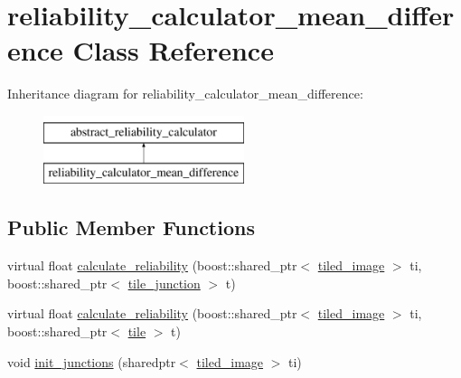 \hypertarget{classreliability__calculator__mean__difference}{\section{reliability\-\_\-calculator\-\_\-mean\-\_\-difference Class Reference}
\label{classreliability__calculator__mean__difference}
}
Inheritance diagram for reliability\-\_\-calculator\-\_\-mean\-\_\-difference\-:\begin{figure}[H]
\begin{center}
\leavevmode
\includegraphics[height=2.000000cm]{classreliability__calculator__mean__difference}
\end{center}
\end{figure}
\subsection*{Public Member Functions}
\begin{DoxyCompactItemize}
\item 
virtual float \hyperlink{classreliability__calculator__mean__difference_a2d64711ed370d44aae8c276e1507ee4a}{calculate\-\_\-reliability} (boost\-::shared\-\_\-ptr$<$ \hyperlink{classtiled__image}{tiled\-\_\-image} $>$ ti, boost\-::shared\-\_\-ptr$<$ \hyperlink{classtile__junction}{tile\-\_\-junction} $>$ t)
\item 
virtual float \hyperlink{classreliability__calculator__mean__difference_a9e03f2bdf2a04d9a414530598db0cbf4}{calculate\-\_\-reliability} (boost\-::shared\-\_\-ptr$<$ \hyperlink{classtiled__image}{tiled\-\_\-image} $>$ ti, boost\-::shared\-\_\-ptr$<$ \hyperlink{classtile}{tile} $>$ t)
\item 
void \hyperlink{classreliability__calculator__mean__difference_a6a49bd9cf9996cdee5919f2307ca473a}{init\-\_\-junctions} (sharedptr$<$ \hyperlink{classtiled__image}{tiled\-\_\-image} $>$ ti)
\end{DoxyCompactItemize}


